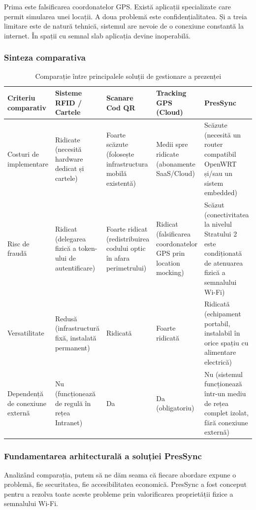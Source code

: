 \documentclass[11pt]{article}
\begin{document}
Prima este falsificarea coordonatelor GPS. Există aplicații specializate care permit simularea unei locații. A doua problemă este confidențialitatea. Și a treia limitare este de natură tehnică, sistemul are nevoie de o conexiune constantă la internet. În spații cu semnal slab aplicația devine inoperabilă.
\newpage
\subsubsection{Sinteza comparativa}

\begin{table}[htbp]
    \centering
    \small
    \setlength{\tabcolsep}{3pt}
    \begin{tabular}{|p{}|p{}|p{}|p{}|p{}|}
        \hline
        \textbf{Criteriu comparativ} & \textbf{Sisteme RFID / Cartele} & \textbf{Scanare Cod QR} & \textbf{Tracking GPS (Cloud)} & \textbf{PresSync} \\
        \hline
        Costuri de implementare & Ridicate (necesită hardware dedicat și cartele) & Foarte scăzute (folosește infrastructura mobilă existentă) & Medii spre ridicate (abonamente SaaS/Cloud) & Scăzute (necesită un router compatibil OpenWRT și/sau un sistem embedded) \\
        \hline
        Risc de fraudă & Ridicat (delegarea fizică a token-ului de autentificare) & Foarte ridicat (redistribuirea codului optic în afara perimetrului) & Ridicat (falsificarea coordonatelor GPS prin location mocking) & Scăzut (conectivitatea la nivelul Stratului 2 este condiționată de atenuarea fizică a semnalului Wi-Fi) \\
        \hline
        Versatilitate & Redusă (infrastructură fixă, instalată permanent) & Ridicată & Foarte ridicată & Ridicată (echipament portabil, instalabil în orice spațiu cu alimentare electrică) \\
        \hline
        Dependență de conexiune externă & Nu (funcționează de regulă în rețea Intranet) & Da & Da (obligatoriu) & Nu (sistemul funcționează într-un mediu de rețea complet izolat, fără conexiune externă) \\
        \hline
    \end{tabular}
    \caption{Comparație între principalele soluții de gestionare a prezenței}
    \label{tab:sinteza-comparativa}
\end{table}

\subsubsection{Fundamentarea arhitecturală a soluției PresSync}
Analizând comparația, putem să ne dăm seama că fiecare abordare expune o problemă, fie securitatea, fie accesibilitatea economică. PresSync a fost conceput pentru a rezolva toate aceste probleme prin valorificarea proprietății fizice a semnalului Wi-Fi.
\end{document}
